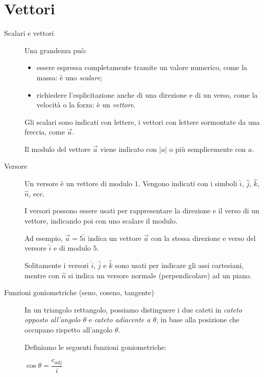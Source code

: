 \documentclass[a4paper,11pt,italian]{article}
\begin{document}
\maketitle
\vspace{8em}
\tableofcontents

\newpage
\section{Vettori}

\begin{description}
  \item[Scalari e vettori] 
  Una grandezza può:
\begin{itemize}
  \item essere espressa completamente tramite un valore numerico, come la massa: è uno \emph{scalare};
  \item richiedere l'esplicitazione anche di una direzione e di un verso, come la velocità o la forza: è un \emph{vettore}.
\end{itemize}
  Gli scalari sono indicati con lettere, i vettori con lettere sormontate da una freccia, come $ \vec{a} $.
  
  Il modulo del vettore $ \vec{a} $ viene indicato con $ |a| $ o più semplicemente con $ a $.
  
  \item[Versore]
  Un versore è un vettore di modulo $ 1 $. Vengono indicati con i simboli $ \hat{i}  $, $ \hat{j} $, $ \hat{k} $, $ \hat{n} $, ecc.
  
  I versori possono essere usati per rappresentare la direzione e il verso di un vettore, indicando poi con uno scalare il modulo.
  
  Ad esempio, $ \vec{a} = 5\hat{i}  $ indica un vettore $ \vec{a} $ con la stessa direzione e verso del versore $ \hat{i} $ e di modulo $ 5 $.
  
  Solitamente i versori $ \hat{i}  $, $ \hat{j} $ e $ \hat{k} $ sono usati per indicare gli assi cartesiani, 
  mentre con $ \hat{n} $ si indica un versore normale (perpendicolare) ad un piano.
  
  \item[Funzioni goniometriche (seno, coseno, tangente)]
  In un triangolo rettangolo, possiamo distinguere i due cateti in \emph{cateto opposto all'angolo $ \theta $} 
  e \emph{cateto adiacente a $ \theta $}, in base alla posizione che occupano rispetto all'angolo $ \theta $.
  
  Definiamo le seguenti funzioni goniometriche:
\begin{multicols}{3}
  \begin{center}
  $ \cos\theta = \dfrac{c_{adj}}{i} $
  

\end{center}
\end{multicols}
\end{description}
\end{document}
